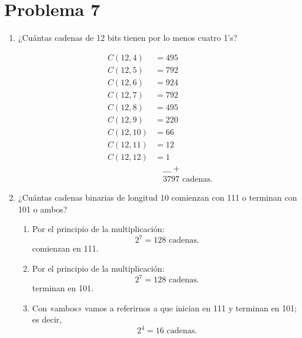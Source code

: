 \section{Problema 7}
\begin{enumerate}
    \item ¿Cuántas cadenas de 12 bits tienen por lo menos cuatro 1’s?
    \begin{solution}
    \begin{align*}
        C(12,4) &= 495\\
        C(12,5) &= 792\\
        C(12,6) &= 924\\
        C(12,7) &= 792\\
        C(12,8) &= 495\\
        C(12,9) &= 220\\
        C(12,10) &=66 \\
        C(12,11) &=12 \\
        C(12,12) &= 1\\
                 &\quad \_\_\_+\\
                 & \quad 3797 \text{ cadenas.}
    \end{align*}
    \end{solution}
    \item ¿Cuántas cadenas binarias de longitud 10 comienzan con 111 o terminan con 101 o ambos?
    \begin{enumerate}
        \item Por el principio de la multiplicación:
        $$2^7=128 \text{ cadenas.}$$ comienzan en 111.
        \item Por el principio de la multiplicación:
        $$2^7=128\text{ cadenas.}$$ terminan en 101.
        \item Con «ambos» vamos a referirnos a que inician en 111 y terminan en 101; es decir, 
        $$2^4=16\text{ cadenas.}$$
    \end{enumerate}
\end{enumerate}


